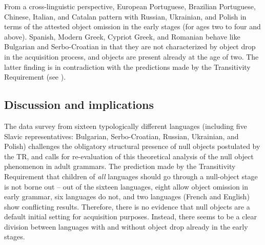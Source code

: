\documentclass[output=paper,
modfonts,
newtxmath,
hidelinks,
]{langscibook}
\begin{document}
From a cross-linguistic perspective, European Portuguese, Brazilian Portuguese, Chinese, Italian, and Catalan pattern with Russian, Ukrainian, and Polish in terms of the attested object omission in the early stages (for ages two to four and above). Spanish, Modern Greek, Cypriot Greek, and Romanian behave like Bulgarian and Serbo-Croatian in that they are not characterized by object drop in the acquisition process, and objects are present already at the age of two. The latter finding is in contradiction with the predictions made by the Transitivity Requirement (see ).

\subsection{Discussion and implications}\label{17:sec:key:3.3}

The data survey from sixteen typologically different languages (including five Slavic representatives: Bulgarian, Serbo-Croatian, Russian, Ukrainian, and Polish) challenges the obligatory structural presence of null objects postulated by the TR, and calls for re-evaluation of this theoretical analysis of the null object phenomenon in adult grammars. The prediction made by the Transitivity Requirement that children of \textit{all} languages should go through a null-object stage is not borne out -- out of the sixteen languages, eight allow object omission in early grammar, six languages do not, and two languages (French and English) show conflicting results. Therefore, there is no evidence that null objects are a default initial setting for acquisition purposes. Instead, there seems to be a clear division between languages with and without object drop already in the early stages.
\end{document}
